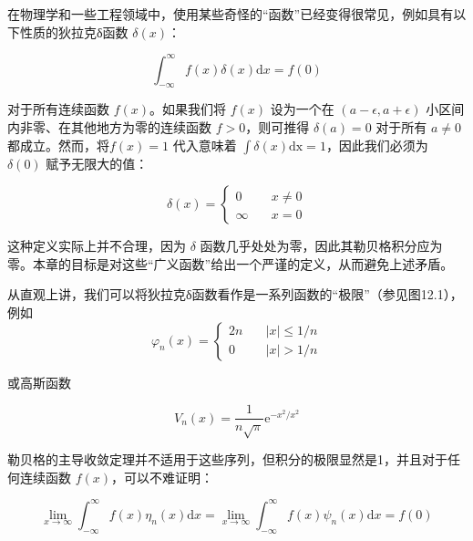 在物理学和一些工程领域中，使用某些奇怪的``函数''已经变得很常见，例如具有以下性质的狄拉克δ函数
$\delta(x)$：

$$
\int_{-\infty}^{\infty} f(x) \delta(x) \mathrm{d} x=f(0)
$$

对于所有连续函数 $f(x)$。如果我们将 $f(x)$ 设为一个在
$(a-\epsilon, a+\epsilon)$ 小区间内非零、在其他地方为零的连续函数
$f > 0$，则可推得 $\delta(a) = 0$ 对于所有 $a \neq 0$都成立。然而，将$f(x)=1$ 代入意味着 $\int \delta(x) \mathrm{dx}=1$，因此我们必须为
$\delta(0)$ 赋予无限大的值：

$$
\delta(x)= \begin{cases}0 & \quad x \neq 0 \\ \infty & \quad x=0\end{cases}
$$

这种定义实际上并不合理，因为 $\delta$
函数几乎处处为零，因此其勒贝格积分应为零。本章的目标是对这些``广义函数''给出一个严谨的定义，从而避免上述矛盾。

从直观上讲，我们可以将狄拉克δ函数看作是一系列函数的``极限''（参见图12.1），例如
\begin{equation}
  \varphi_n(x)= \begin{cases}2 n & \quad|x| \leq 1 / n \\ 0 & \quad|x|>1 / n\end{cases}
\end{equation}


或高斯函数

$$
V_n(x)=\frac{1}{n \sqrt{\pi}} \mathrm{e}^{-x^2 / x^2}
$$

勒贝格的主导收敛定理并不适用于这些序列，但积分的极限显然是1，并且对于任何连续函数
$f(x)$，可以不难证明：

$$
\lim _{x \rightarrow \infty} \int_{-\infty}^{\infty} f(x) \eta_n(x) \mathrm{d} x=\lim _{x \rightarrow \infty} \int_{-\infty}^{\infty} f(x) \psi_n(x) \mathrm{d} x=f(0)
$$

